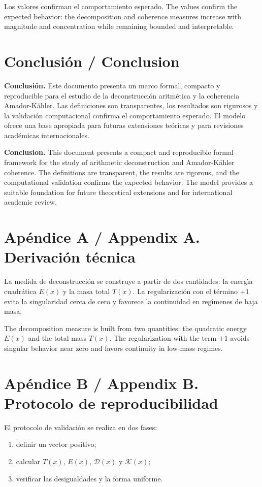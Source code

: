 \documentclass[11pt]{article}
\begin{document}
Los valores confirman el comportamiento esperado. The values confirm the expected behavior: the decomposition and coherence measures increase with magnitude and concentration while remaining bounded and interpretable.

\section{Conclusi\'on / Conclusion}
\textbf{Conclusi\'on.} Este documento presenta un marco formal, compacto y reproducible para el estudio de la deconstrucci\'on aritm\'etica y la coherencia Amador-K\"ahler. Las definiciones son transparentes, los resultados son rigurosos y la validaci\'on computacional confirma el comportamiento esperado. El modelo ofrece una base apropiada para futuras extensiones te\'oricas y para revisiones acad\'emicas internacionales.

\textbf{Conclusion.} This document presents a compact and reproducible formal framework for the study of arithmetic deconstruction and Amador-K\"ahler coherence. The definitions are transparent, the results are rigorous, and the computational validation confirms the expected behavior. The model provides a suitable foundation for future theoretical extensions and for international academic review.

\appendix
\section{Ap\'endice A / Appendix A. Derivaci\'on t\'ecnica}
La medida de deconstrucci\'on se construye a partir de dos cantidades: la energ\'{\i}a cuadr\'atica $E(x)$ y la masa total $T(x)$. La regularizaci\'on con el t\'ermino $+1$ evita la singularidad cerca de cero y favorece la continuidad en reg\'{\i}menes de baja masa.

The decomposition measure is built from two quantities: the quadratic energy $E(x)$ and the total mass $T(x)$. The regularization with the term $+1$ avoids singular behavior near zero and favors continuity in low-mass regimes.

\section{Ap\'endice B / Appendix B. Protocolo de reproducibilidad}
El protocolo de validaci\'on se realiza en dos fases:
\begin{enumerate}[label=\arabic*.]
\item definir un vector positivo;
\item calcular $T(x)$, $E(x)$, $\mathcal{D}(x)$ y $\mathcal{K}(x)$;
\item verificar las desigualdades y la forma uniforme.
\end{enumerate}
\end{document}
